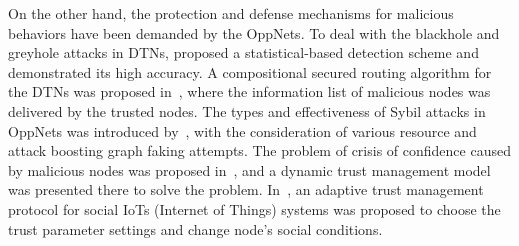 On the other hand,
the protection and defense mechanisms for malicious behaviors have
been demanded by the OppNets.
To deal with the blackhole and greyhole attacks
in DTNs,
\cite{Pham2016Detecting} proposed a statistical-based detection scheme and
demonstrated its high accuracy.
A compositional secured routing algorithm for the DTNs
was proposed in~\cite{Saha2018Design},
where the information list of malicious nodes was delivered by the trusted nodes.
The types and effectiveness of Sybil attacks in OppNets
was introduced by~\cite{Sacha2016Stalk},
with the consideration of various resource and
attack boosting graph faking attempts.
The problem of crisis of confidence caused by malicious nodes
was proposed in~\cite{Yao2016Secure},
and a dynamic trust management model
was presented there to solve the problem.
In~\cite{Chen2016Trust},
an adaptive trust management
protocol for social IoTs (Internet of Things) systems was proposed
to choose the trust parameter settings and change node's social conditions.
%
